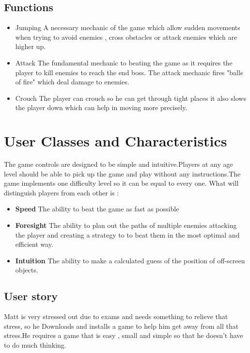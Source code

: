 \subsection{Functions}
\begin{itemize}
    \item Jumping
    A necessary mechanic of the game which allow sudden movements when trying to avoid enemies , cross obstacles or attack enemies which are higher up.
    \item Attack
    The fundamental mechanic to beating the game as it requires the player to kill enemies to reach the end boss. The attack mechanic fires "balls of fire" which deal damage to enemies.
    \item Crouch
    The player can crouch so he can get through tight places it also slows the player down which can help in moving more precisely.
\end{itemize}
\section{User Classes and Characteristics}
The game controls are designed to be simple and intuitive.Players at any age level should be able to pick up the game and play without any instructions.The game implements one difficulty level so it can be equal to every one. 
What will distinguish players from each other is : 
\begin{itemize}
    \item \textbf{Speed} The ability to beat the game as fast as possible
    \item \textbf{Foresight} The ability to plan out the paths of multiple enemies attacking the player and creating a strategy to to beat them in the most optimal and efficient way.
    \item \textbf{Intuition} The ability to make a calculated guess of the position of off-screen objects.
    
\end{itemize}

\subsection{User story}
Matt is very stressed out due to exams and needs something to relieve that stress, so he Downloads and installs a game to help him get away from all that stress.He requires a game that is easy , small and simple so that he doesn't have to do much thinking.

